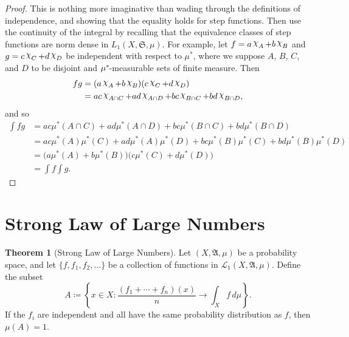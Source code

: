 \documentclass[
twoside=true,
paper=letter,
fontsize=9pt,
pagesize=auto,
leqno,
openany,
headsepline,
overfullrule,
]{scrbook}
\theoremstyle{plain}
\theoremstyle{plain}
\theoremstyle{definition}
\theoremstyle{bfnoteitalic}
\newtheorem{thmboldnote}[thm]{Theorem}
\theoremstyle{bfnoteroman}
\newcommand{\sigalg}[1]{\mathfrak{#1}}
\newcommand{\cali}[1]{\mathscr{#1}}
\newcommand{\definedby}{\coloneqq}
\newcommand{\charfunction}[1]{\mathop{{\raisebox{2pt}{$\chi$}}_{#1}}}
\newcommand{\meets}{\cap}
\newcommand{\semiring}{\sigalg{S}}
\newcommand{\sigmaalgebra}{\sigalg{A}}
\newcommand{\kernast}{\ast\kern-1pt}
\newcommand{\function}{f}
\newcommand{\functionii}{g}
\newcommand{\measurespace}{X}
\newcommand{\mspaceelt}{x}
\newcommand{\measure}{\mu}
\newcommand{\seti}{A}
\newcommand{\setii}{B}
\newcommand{\setiii}{C}
\newcommand{\setiv}{D}
\begin{document}
\begin{proof}
This is nothing more imaginative than wading through the definitions of independence,
and showing that the equality holds for step functions. Then use the continuity of the integral by recalling that the equivalence classes of step functions are norm dense in 
$L_1(\measurespace, \semiring,\measure)$.
For example, let 
$\function = a\charfunction{\seti} + b\charfunction{\setii}$ and 
$\functionii = c\charfunction{\setiii} + d\charfunction{\setiv}$ be independent with respect to $\measure^*$,
where we suppose $\seti$, $\setii$, $\setiii$, and $\setiv$ to be disjoint and $\measure^\kernast$-measurable sets of finite measure. Then
\begin{align*}
\function\functionii 
& =
(a\charfunction{\seti} + b\charfunction{\setii})
(c\charfunction{\setiii} + d\charfunction{\setiv}) \\
& = ac\charfunction{\seti\meets\setiii}
+ ad\charfunction{\seti\meets\setiv}
+ bc\charfunction{\setii\meets\setiii}
+ bd\charfunction{\setii\meets\setiv},
\end{align*}
and so 
\begin{align*}
\int fg 
& = ac\measure^*(\seti\meets\setiii)
+ ad\measure^*(\seti\meets\setiv)
+ bc\measure^*(\setii\meets\setiii)
+ bd\measure^*(\setii\meets\setiv)\\
& = ac\measure^*(\seti)\measure^*(\setiii)
+ ad\measure^*(\seti)\measure^*(\setiv)
+ bc\measure^*(\setii)\measure^*(\setiii)
+ bd\measure^*(\setii)\measure^*(\setiv)\\
& = \bigl(a\measure^*(\seti) + b\measure^*(\setii)\bigr)
\bigl(c\measure^*(\setiii) + d\measure^*(\setiv)\bigr) \\
& = \int \function \int \functionii.
\end{align*}
\end{proof}




\section{Strong Law of Large Numbers}
\begin{thmboldnote}[Strong Law of Large Numbers]\label{large_numbers}
Let $(\measurespace,\sigmaalgebra,\measure)$ be a probability space, and let
$\{\function, \function_1,\function_2,\ldots\}$ be a collection of functions in  $\cali{L}_1(\measurespace,\sigmaalgebra,\measure)$. Define the subset
\[
\seti \definedby
\left\{ \mspaceelt\in\measurespace : 
\frac{(\function_1 + \cdots + \function_n)(\mspaceelt)}{n}
\to 
\int_\measurespace \function \, d\measure
\right\}.
\]
If the $\function_i$ are independent and all have the same probability distribution as $\function$, then 
$\measure(\seti) = 1$.
\end{thmboldnote}
\end{document}
